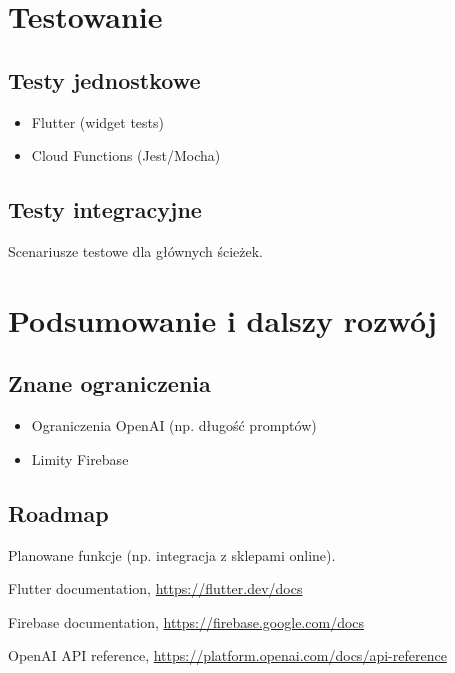 \documentclass[a4paper, 12pt]{article}
\begin{document}
\section{Testowanie}
\subsection{Testy jednostkowe}
\begin{itemize}
    \item Flutter (widget tests)
    \item Cloud Functions (Jest/Mocha)
\end{itemize}

\subsection{Testy integracyjne}
Scenariusze testowe dla głównych ścieżek.

\newpage
\section{Podsumowanie i dalszy rozwój}
\subsection{Znane ograniczenia}
\begin{itemize}
    \item Ograniczenia OpenAI (np. długość promptów)
    \item Limity Firebase
\end{itemize}

\subsection{Roadmap}
Planowane funkcje (np. integracja z sklepami online).

\begin{thebibliography}{9}
Flutter documentation, \url{https://flutter.dev/docs}

Firebase documentation, \url{https://firebase.google.com/docs}

OpenAI API reference, \url{https://platform.openai.com/docs/api-reference}
\end{thebibliography}
\end{document}
